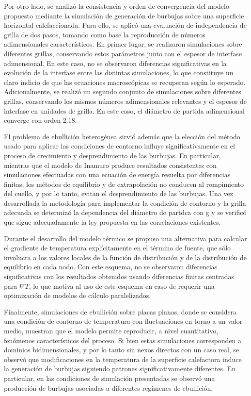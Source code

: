 Por otro lado, se analiz\'o la consistencia y orden de convergencia del modelo propuesto mediante la simulaci\'on de generaci\'on de burbujas sobre una superficie horizontal calefaccionada. Para ello, se aplic\'o una evaluaci\'on de independencia de grilla de dos pasos, tomando como base la reproducci\'on de n\'umeros adimensionales caracter\'isticos. En primer lugar, se realizaron simulaciones sobre diferentes grillas, conservando estos par\'ametros junto con el espesor de interfase adimensional. En este caso, no se observaron diferencias significativas en la evoluci\'on de la interfase entre las distintas simulaciones, lo que constituye un claro indicio de que las ecuaciones macrosc\'opicas se recuperan seg\'un lo esperado. Adicionalmente, se realiz\'o un segundo conjunto de simulaciones sobre diferentes grillas, conservando los mismos n\'umeros adimensionales relevantes y el espesor de interfase en unidades de grilla. En este caso, el di\'ametro de partida adimensional converge con orden 2.18.

El problema de ebullici\'on heterog\'enea sirvi\'o adem\'as que la elecci\'on del m\'etodo usado para aplicar las condiciones de contorno influye significativamente en el proceso de crecimiento y desprendimiento de las burbujas. En particular, mientras que el modelo de Inamuro produce resultados consistentes con simulaciones efectuadas con una ecuaci\'on de energ\'ia resuelta por diferencias finitas, los m\'etodos de equilibrio y de extrapolaci\'on no conducen al rompimiento del cuello, y por lo tanto, evitan el desprendimiento de las burbujas. Una vez desarrollada la metodología para implementar la condici\'on de contorno y la grilla adecuada se determin\'o la dependencia del diámetro de partdca con g y se verific\'o que sigue adecuadamente la ley propuesta en las correlaciones existentes.

Durante el desarrollo del modelo t\'ermico se propuso una alternativa para calcular el gradiente de temperatura expl\'icitamente en el t\'ermino de fuente, que s\'olo involucra a los valores locales de la funci\'on de distribuci\'on y de la distribuci\'on de equilibrio en cada nodo. Con este esquema, no se observaron diferencias significativas con los resultados obtenidos usando diferencias finitas centradas para $\nabla T$, lo que motiva al uso de este esquema en caso de requerir una optimizaci\'on de modelos de c\'alculo paralelizados.

Finalmente, simulaciones de ebullici\'on sobre placas planas, donde se considera una condici\'on de contorno de temperatura con fluctuaciones en torno a un valor medio, muestran que el modelo permite reproducir, a nivel cuantitativo, fen\'omenos caracter\'isticos del proceso. Si bien estas simulaciones corresponden a dominios bidimensionales, y por lo tanto sin nexos directos con un caso real, se observ\'o que modificaciones en la temperatura de la superficie calefactora induce la generaci\'on de burbujas siguiendo patrones significativamente diferentes. En particular, en las condiciones de simulaci\'on presentadas se observ\'o una producci\'on de burbujas asociadas a diferentes reg\'imenes de ebullici\'on.
